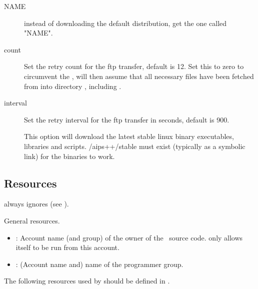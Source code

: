 \begin{description}
\item[ NAME]
  instead of downloading the default distribution, get the one called "NAME".

\item[ count]
   Set the retry count for the ftp transfer, default is 12.  Set this to zero
   to circumvent the ,  will then assume that all
   necessary files have been fetched from  into directory
   , including .

\item[ interval]
   Set the retry interval for the ftp transfer in seconds, default is 900.

\item[]
   This option will download the latest stable linux binary executables,
   libraries and scripts. /aips++/stable must exist (typically as a symbolic
   link) for the binaries to work.

\end{description}

\subsection*{Resources}

 always ignores  (see ).

\noindent
General resources.

\begin{itemize}
\item
   : Account name (and group) of the owner of the
   \aipspp\ source code.   only allows itself to be run from this
   account.

\item
   : (Account name and) name of the \aipspp
   programmer group.
\end{itemize}

\noindent
The following resources used by  should be defined in
.

